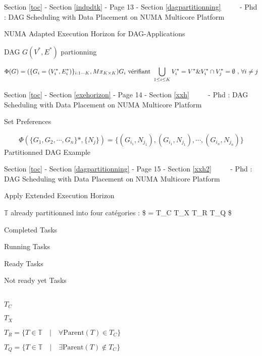 \documentclass[11pt]{article}
\begin{document}
     {Section \ref{toc} - Section \ref{indpdtk} - Page 13 -
Section \ref{dagpartitionning} ~~~~ - Phd : DAG Scheduling with Data
Placement on NUMA Multicore Platform}

NUMA Adapted Execution Horizon for DAG-Applications

DAG \(G(V^*,E^*)\) partionning

\[
\Phi(G) = (\{ G_i = (V^*_i, E^*_i) \}_{i:1 \cdots K}, Mx_{K \times K}) \\
G_i \text{ vérifiant } \bigcup_{1 \le i \le K} V^*_i = V^* \&  V^*_i \cap V^*_j = \emptyset \text{ , } \forall i \neq j
\] 

     {Section \ref{toc} - Section \ref{exehorizon} - Page 14 -
Section \ref{xxh} ~~~~ - Phd : DAG Scheduling with Data Placement on
NUMA Multicore Platform}

Set Preferences

\[
\Phi(\{ G_1, G_2, \cdots , G_n\}*, \{N_j\}) = \{(G_{i_1},N_{j_1}), (G_{i_1},N_{j_1}), \cdots, (G_{i_n},N_{j_n}) \}
\] Partitionned DAG Example 

     {Section \ref{toc} - Section \ref{dagpartitionning} - Page 15 -
Section \ref{xxh2} ~~~~ - Phd : DAG Scheduling with Data Placement on
NUMA Multicore Platform}

Apply Extended Execution Horizon

\(\mathbb{T}\) already partitionned into four catégories : \$
= T\_C \cup T\_X \cup T\_R \cup T\_Q \$

\textbar{}

Completed Tasks

\textbar{}

Running Tasks

\textbar{}

Ready Tasks

\textbar{}

Not ready yet Tasks

\begin{longtable}[]{@{}llll@{}}
\toprule
\bottomrule
\end{longtable}

\textbar{}

\(T_C\)

\textbar{}

\(T_X\)

\textbar{}

\(T_R = \{ T \in \mathbb{T} \quad | \quad \forall \text{Parent}(T) \in T_C \}\)

\textbar{}

\(T_Q = \{ T \in \mathbb{T} \quad | \quad \exists \text{Parent}(T) \notin T_C \}\)
\end{document}
